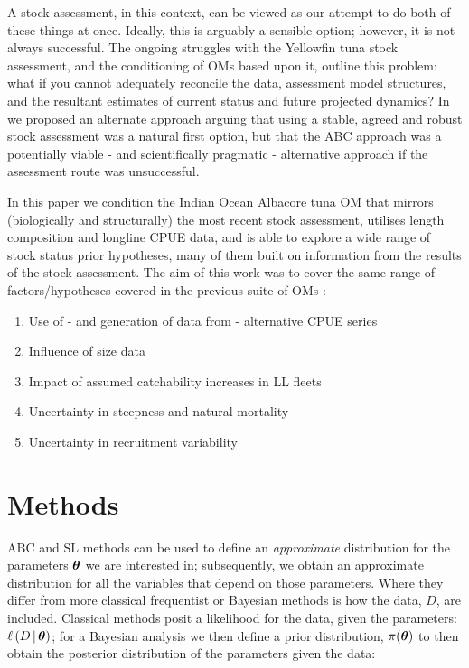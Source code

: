 \documentclass[11pt]{article}
\newcommand{\xtheta}{\mbox{\boldmath$\theta$}}
\begin{document}
A stock assessment, in this context, can be viewed as our attempt to do both of these things at once. Ideally, this is arguably a sensible option; however, it is not always successful. The ongoing struggles with the Yellowfin tuna stock assessment, and the conditioning of OMs based upon it, outline this problem: what if you cannot adequately reconcile the data, assessment model structures, and the resultant estimates of current status and future projected dynamics? In \cite{om21} we proposed an alternate approach arguing that using a stable, agreed and robust stock assessment was a natural first option, but that the ABC approach was a potentially viable - and scientifically pragmatic - alternative approach if the assessment route was unsuccessful.

In this paper we condition the Indian Ocean Albacore tuna OM that mirrors (biologically and structurally) the most recent stock assessment, utilises length composition and longline CPUE data, and is able to explore a wide range of stock status prior hypotheses, many of them built on information from the results of the stock assessment. The aim of this work was to cover the
same range of factors/hypotheses covered in the previous suite of OMs \cite{alb}:

\begin{enumerate}
    \item Use of - and generation of data from - alternative CPUE series
    \item Influence of size data
    \item Impact of assumed catchability increases in LL fleets
    \item Uncertainty in steepness and natural mortality
    \item Uncertainty in recruitment variability
\end{enumerate}

\section{Methods}

ABC \cite{abc} and SL \cite{synlkhd} methods can be used to define an \emph{approximate} distribution for the parameters $\xtheta$ we are interested in; subsequently, we obtain an approximate distribution for all the variables that depend on those parameters. Where they differ from more classical frequentist or Bayesian methods is how the data, $D$, are included. Classical methods posit a likelihood for the data, given the parameters: $\ell\left(D\,|\,\xtheta\right)$; for a Bayesian analysis we then define a prior distribution, $\pi(\xtheta)$ to then obtain the posterior distribution of the parameters given the data:
\end{document}
